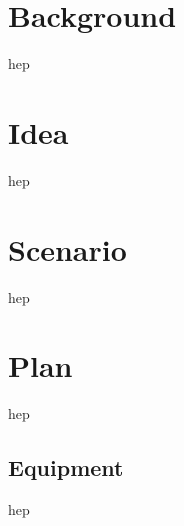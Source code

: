 \documentclass{ubicomp2011}
\begin{document}

\section{Background}
hep

\section{Idea}
hep

\section{Scenario}
hep

\section{Plan}
hep


\subsection{Equipment}
hep





\end{document}
